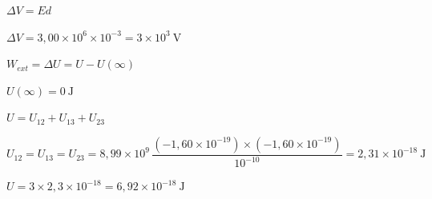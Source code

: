 \begin{solapartat}
 $\mathit{\Delta} V = Ed$

 $\mathit{\Delta} V = 3,00\times 10^{6}\times 10^{-3} = 3\times 10^{3}\ \mathrm{V}$ 
\end{solapartat}

\begin{solapartat}
 $W_{ext} = \mathit{\Delta} U = U - U(\infty)$

 $U(\infty) = 0\ \mathrm{J}$

 $U = U_{12} + U_{13} + U_{23}$

 $U_{12} = U_{13} = U_{23} = 8,99\times 10^{9}\,\dfrac{\left(-1,60\times 10^{-19}\right)\times\left(-1,60\times 10^{-19}\right)}{10^{-10}} = 2,31\times 10^{-18}\ \mathrm{J}$

 $U = 3\times 2,3\times 10^{-18} = 6,92\times 10^{-18}\ \mathrm{J}$
\end{solapartat}

